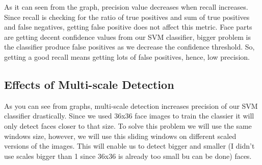 \documentclass{article}
\begin{document}
As it can seen from the graph, precision value decreases when recall increases. Since recall is checking for the ratio of true positives and sum of true positives and false negatives, getting false positive does not affect this metric. Face parts are getting decent confidence values from our SVM classifier, bigger problem is the classifier produce false positives as we decrease the confidence threshold. So, getting a good recall means getting lots of false positives, hence, low precision. 

\subsection{Effects of Multi-scale Detection}

As you can see from graphs, multi-scale detection increases precision of our SVM classifier drastically. Since we used 36x36 face images to train the classier it will only detect faces closer to that size. To solve this problem we will use the same windows size, however, we will use this sliding windows on different scaled versions of the images. This will enable us to detect bigger and smaller (I didn't use scales bigger than 1 since 36x36 is already too small bu can be done) faces.
\end{document}
